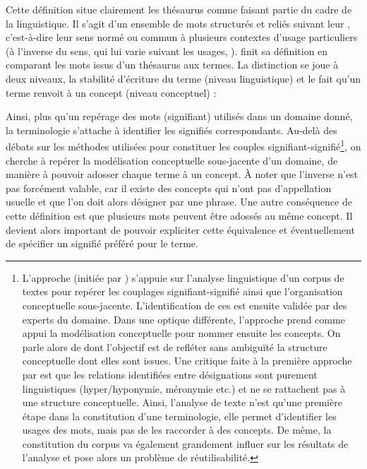 Cette définition situe clairement les thésaurus comme faisant partie du cadre de la linguistique. 
Il s'agit d'un ensemble de mots structurés et reliés suivant leur , c'est-à-dire leur sens normé ou commun à plusieurs contextes d'usage particuliers (à l'inverse du sens, qui lui varie suivant les usages, \cite{Roche2005}). 
\citeauthor{bachimont:icc} finit sa définition en comparant les mots issus d'un thésaurus aux termes. La distinction se joue à deux niveaux, la stabilité d'écriture du terme (niveau linguistique) et le fait qu'un terme renvoit à un concept (niveau conceptuel) : 


Ainsi, plus qu'un repérage des mots (signifiant) utilisés dans un domaine donné, la terminologie s'attache à identifier les signifiés correspondants. 
Au-delà des débats sur les méthodes utilisées pour constituer les couples signifiant-signifié\footnote{L'approche  (initiée par \cite{Bourigault1994}) s'appuie sur l'analyse linguistique d'un corpus de textes pour repérer les couplages signifiant-signifié ainsi que l'organisation conceptuelle sous-jacente. L'identification de ces  est ensuite validée par des experts du domaine. 
Dans une optique différente, l'approche  prend comme appui la modélisation conceptuelle pour nommer ensuite les concepts. On parle alors de  dont l'objectif est de refléter sans ambiguïté la structure conceptuelle dont elles sont issues.
Une critique faite à la première approche par \cite{Roche2006} est que les relations identifiées entre désignations sont purement linguistiques (hyper/hyponymie, méronymie etc.) et ne se rattachent pas à une structure conceptuelle. Ainsi, l'analyse de texte n'est qu'une première étape dans la constitution d'une terminologie, elle permet d'identifier les usages des mots, mais pas de les raccorder à des concepts. De même, la constitution du corpus va également grandement influer sur les résultats de l'analyse et pose alors un problème de réutilisabilité.}, on cherche à repérer la modélisation conceptuelle sous-jacente d'un domaine, de manière à pouvoir adosser chaque terme à un concept.
À noter que l'inverse n'est pas forcément valable, car il existe des concepts qui n'ont pas d'appellation usuelle et que l'on doit alors désigner par une phrase. 
Une autre conséquence de cette définition est que plusieurs mots peuvent être adossés au même concept.
Il devient alors important de pouvoir expliciter cette équivalence et éventuellement de spécifier un signifié préféré pour le terme.

